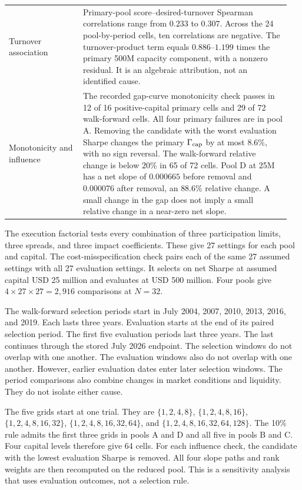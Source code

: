 \documentclass[10pt,letterpaper]{article}
\begin{document}
\begin{longtable}{@{}p{0.25\linewidth}p{0.70\linewidth}@{}}
Turnover association & Primary-pool score--desired-turnover Spearman correlations range from $0.233$ to $0.307$. Across the 24 pool-by-period cells, ten correlations are negative. The turnover-product term equals $0.886$--$1.199$ times the primary 500M capacity component, with a nonzero residual. It is an algebraic attribution, not an identified cause.\\
Monotonicity and influence & The recorded gap-curve monotonicity check passes in 12 of 16 positive-capital primary cells and 29 of 72 walk-forward cells. All four primary failures are in pool A. Removing the candidate with the worst evaluation Sharpe changes the primary $\Gamma_{\rm cap}$ by at most $8.6\%$, with no sign reversal. The walk-forward relative change is below $20\%$ in 65 of 72 cells. Pool D at 25M has a net slope of $0.000665$ before removal and $0.000076$ after removal, an $88.6\%$ relative change. A small change in the gap does not imply a small relative change in a near-zero net slope.\\
\bottomrule
\end{longtable}

The execution factorial tests every combination of three participation limits, three spreads, and three impact coefficients. These give 27 settings for each pool and capital. The cost-misspecification check pairs each of the same 27 assumed settings with all 27 evaluation settings. It selects on net Sharpe at assumed capital USD 25 million and evaluates at USD 500 million. Four pools give $4\times27\times27=2{,}916$ comparisons at $N=32$.

The walk-forward selection periods start in July 2004, 2007, 2010, 2013, 2016, and 2019. Each lasts three years. Evaluation starts at the end of its paired selection period. The first five evaluation periods last three years. The last continues through the stored July 2026 endpoint. The selection windows do not overlap with one another. The evaluation windows also do not overlap with one another. However, earlier evaluation dates enter later selection windows. The period comparisons also combine changes in market conditions and liquidity. They do not isolate either cause.


The five grids start at one trial. They are $\{1,2,4,8\}$, $\{1,2,4,8,16\}$, $\{1,2,4,8,16,32\}$, $\{1,2,4,8,16,32,64\}$, and $\{1,2,4,8,16,32,64,128\}$. The 10\% rule admits the first three grids in pools A and D and all five in pools B and C. Four capital levels therefore give 64 cells. For each influence check, the candidate with the lowest evaluation Sharpe is removed. All four slope paths and rank weights are then recomputed on the reduced pool. This is a sensitivity analysis that uses evaluation outcomes, not a selection rule.
\end{document}
